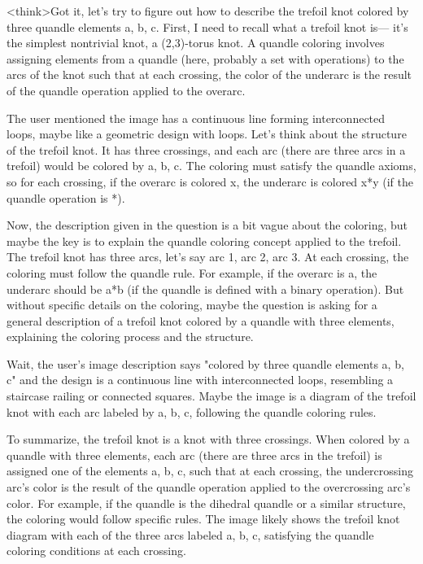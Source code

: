 <think>Got it, let's try to figure out how to describe the trefoil knot colored by three quandle elements a, b, c. First, I need to recall what a trefoil knot is— it's the simplest nontrivial knot, a (2,3)-torus knot. A quandle coloring involves assigning elements from a quandle (here, probably a set with operations) to the arcs of the knot such that at each crossing, the color of the underarc is the result of the quandle operation applied to the overarc. 

The user mentioned the image has a continuous line forming interconnected loops, maybe like a geometric design with loops. Let's think about the structure of the trefoil knot. It has three crossings, and each arc (there are three arcs in a trefoil) would be colored by a, b, c. The coloring must satisfy the quandle axioms, so for each crossing, if the overarc is colored x, the underarc is colored x*y (if the quandle operation is *). 

Now, the description given in the question is a bit vague about the coloring, but maybe the key is to explain the quandle coloring concept applied to the trefoil. The trefoil knot has three arcs, let's say arc 1, arc 2, arc 3. At each crossing, the coloring must follow the quandle rule. For example, if the overarc is a, the underarc should be a*b (if the quandle is defined with a binary operation). But without specific details on the coloring, maybe the question is asking for a general description of a trefoil knot colored by a quandle with three elements, explaining the coloring process and the structure.

Wait, the user's image description says "colored by three quandle elements a, b, c" and the design is a continuous line with interconnected loops, resembling a staircase railing or connected squares. Maybe the image is a diagram of the trefoil knot with each arc labeled by a, b, c, following the quandle coloring rules. 

To summarize, the trefoil knot is a knot with three crossings. When colored by a quandle with three elements, each arc (there are three arcs in the trefoil) is assigned one of the elements a, b, c, such that at each crossing, the undercrossing arc's color is the result of the quandle operation applied to the overcrossing arc's color. For example, if the quandle is the dihedral quandle or a similar structure, the coloring would follow specific rules. The image likely shows the trefoil knot diagram with each of the three arcs labeled a, b, c, satisfying the quandle coloring conditions at each crossing. 

